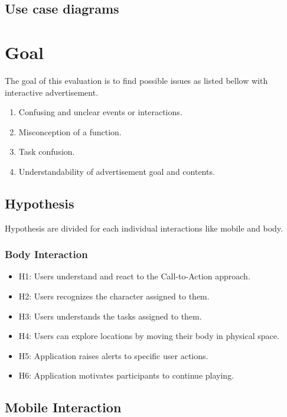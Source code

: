 \subsection{Use case diagrams}



\section{Goal}
The goal of this evaluation is to find possible issues as listed bellow with interactive advertisement. 

\begin{enumerate}
\item   Confusing and unclear events or interactions.
\item   Misconception of a function.
\item   Task confusion.
\item   Understandability of advertisement goal and contents.
\end{enumerate}


\subsection{Hypothesis}
Hypothesis are divided for each individual interactions like mobile and body.

\subsubsection{Body Interaction}

\begin{itemize}

\item H1: Users understand and react to the Call-to-Action approach.
\item H2: Users recognizes the character assigned to them.
\item H3: Users understands the tasks assigned to them.
\item H4: Users can explore locations by moving their body in physical space.
\item H5: Application raises alerts to specific user actions.
\item H6: Application motivates participants to continue playing.
\end{itemize}

\subsection{Mobile Interaction}

